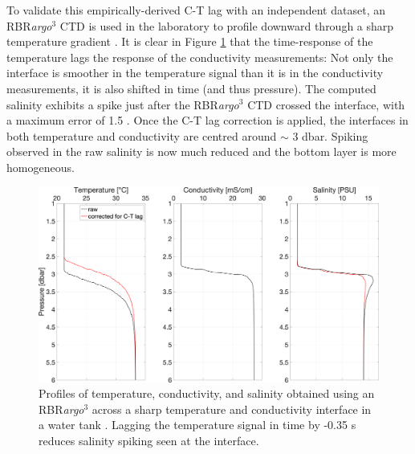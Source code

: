 \documentclass{ametsocV6.1}
\begin{document}
To validate this empirically-derived C-T lag with an independent dataset, an RBR\textit{argo}$^3$ CTD is used in the laboratory to profile downward through a sharp temperature gradient \citep[Figure \ref{fig: WHOI_tank}; ][]{Schmitt_2005}.  It is clear in Figure \ref{fig: WHOI_tank} that the time-response of the temperature lags the response of the conductivity measurements: Not only the interface is smoother in the temperature signal than it is in the conductivity measurements, it is also shifted in time (and thus pressure).  The computed salinity exhibits a spike just after the RBR\textit{argo}$^3$ CTD crossed the interface, with a maximum error of 1.5 . Once the C-T lag correction is applied, the interfaces in both temperature and conductivity are centred around $\sim$ 3 dbar. Spiking observed in the raw salinity is now much reduced and the bottom layer is more homogeneous.  

\begin{figure}[t]
	\centering
	\includegraphics[width=.9\linewidth]{Fig8_Profile_example_CTlag}
	\caption{Profiles of temperature, conductivity, and salinity obtained using an RBR\textit{argo}$^3$ across a sharp temperature and conductivity interface in a water tank \citep{Schmitt_2005}. Lagging the temperature signal in time by -0.35 s reduces salinity spiking seen at the interface.}
	\label{fig: WHOI_tank}
\end{figure}
\end{document}

